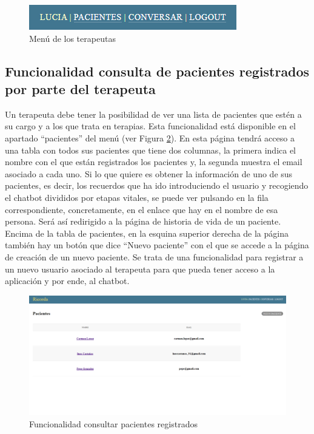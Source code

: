 \begin{figure}[h]
	\centering
	\includegraphics[scale=1.0]{Imagenes/Vectorial/funcionalidad_terapeutavspaciente}
	\caption{Menú de los terapeutas}
	\label{fig:funcionalidadterapeutavspacientes}
\end{figure}

\subsection{Funcionalidad consulta de pacientes registrados por parte del terapeuta}

Un terapeuta debe tener la posibilidad de ver una lista de pacientes que estén a su cargo y a los que trata en terapias. Esta funcionalidad está disponible en el apartado ``pacientes'' del menú (ver Figura \ref{fig:funcionalidadconsultadepacientes}). En esta página tendrá acceso a una tabla con todos sus pacientes que tiene dos columnas, la primera indica el nombre con el que están registrados los pacientes y, la segunda muestra el email asociado a cada uno. Si lo que quiere es obtener la información de uno de sus pacientes, es decir, los recuerdos que ha ido introduciendo el usuario y recogiendo el chatbot divididos por etapas vitales, se puede ver pulsando en la fila correspondiente, concretamente, en el enlace que hay en el nombre de esa persona. Será así redirigido a la página de historia de vida de un paciente. Encima de la tabla de pacientes, en la esquina superior derecha de la página también hay un botón que dice ``Nuevo paciente'' con el que se accede a la página de creación de un nuevo paciente. Se trata de una funcionalidad para registrar a un nuevo usuario asociado al terapeuta para que pueda tener acceso a la aplicación y por ende, al chatbot.

\begin{figure}[h]
	\centering
	\includegraphics[scale=0.3]{Imagenes/Vectorial/funcionalidad_consultar_pacientes}
	\caption{Funcionalidad consultar pacientes registrados}
	\label{fig:funcionalidadconsultadepacientes}
\end{figure}


